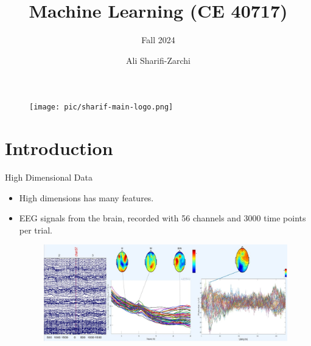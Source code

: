 \documentclass[serif, aspectratio=169]{beamer}
\author{Ali Sharifi-Zarchi}
\title{Machine Learning (CE 40717)}
\subtitle{Fall 2024}
\institute{
    CE Department \\
    Sharif University of Technology
}
\begin{document}
\begin{frame}
    \titlepage
    \vspace*{-0.6cm}
    \begin{figure}[htpb]
        \begin{center}
            \texttt{[image: pic/sharif-main-logo.png]}
        \end{center}
    \end{figure}
\end{frame}

\begin{frame}    
\tableofcontents[sectionstyle=show,
subsectionstyle=show/shaded/hide,
subsubsectionstyle=show/shaded/hide]
\end{frame}

\section{Introduction}

\begin{frame}{High Dimensional Data}
    \begin{itemize}
        \item High dimensions has many features.
        \item EEG signals from the brain, recorded with 56 channels and 3000 time points per trial.

        \begin{figure}[htpb]
            \begin{center}
                \includegraphics[keepaspectratio, scale=0.4]{pic/brain.JPG}
            \end{center}
        \end{figure}
    \end{itemize}
\end{frame}
\end{document}

